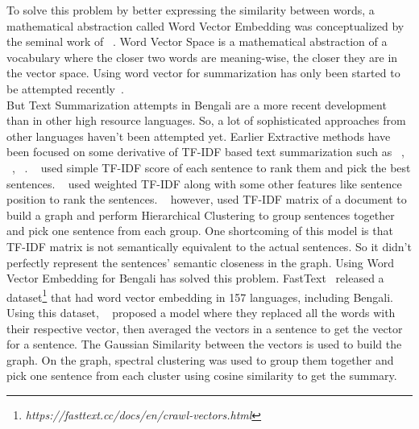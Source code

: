 To solve this problem by better expressing the similarity between words,
a mathematical abstraction called Word Vector Embedding was conceptualized by the seminal
work of \citeauthor{salton-1975-word-vector}~\cite{salton-1975-word-vector}.
Word Vector Space is a mathematical abstraction of a vocabulary where the closer two words
are meaning-wise, the closer they are in the vector space.
Using word vector for summarization has only been started
to be attempted recently~\cite{Jain-2017-word-vector-embedding-summary}.\\

But Text Summarization attempts in Bengali are a more recent development than in other high resource languages.
So, a lot of sophisticated approaches from other languages haven't been attempted yet.
Earlier Extractive methods have been focused on some derivative of TF-IDF based text
summarization such as \citeauthor{chowdhury-etal-2021-tfidf-clustering}~\cite{chowdhury-etal-2021-tfidf-clustering},
\citeauthor{das-2022-tfidf}~\cite{das-2022-tfidf}, \citeauthor{sarkar-2012-tfidf}~\cite{sarkar-2012-tfidf}.
\citeauthor{sarkar-2012-tfidf}~\cite{sarkar-2012-tfidf} used simple TF-IDF score of each sentence to rank them and
pick the best sentences.
\citeauthor{das-2022-tfidf}~\cite{das-2022-tfidf} used weighted TF-IDF along with some other features like sentence position
to rank the sentences.
\citeauthor{chowdhury-etal-2021-tfidf-clustering}~\cite{chowdhury-etal-2021-tfidf-clustering} however, used TF-IDF
matrix of a document to build a graph and perform Hierarchical Clustering to group sentences together and pick one
sentence from each group.
One shortcoming of this model is that TF-IDF matrix is not semantically equivalent to the actual sentences.
So it didn't perfectly represent the sentences' semantic closeness in the graph.
Using Word Vector Embedding for Bengali has solved this problem.
FastText~\cite{grave-etal-2018-fasttext} released a dataset\footnote{\textit{https://fasttext.cc/docs/en/crawl-vectors.html}}
that had word vector embedding in 157 languages, including Bengali.
Using this dataset, \citeauthor{roychowdhury-etal-2022-spectral-base}~\cite{roychowdhury-etal-2022-spectral-base}
proposed a model where they replaced all the words with their respective vector, then averaged the vectors in a
sentence to get the vector for a sentence.
The Gaussian Similarity between the vectors is used to build the graph.
On the graph, spectral clustering was used to group them together and pick one sentence from each cluster using cosine
similarity to get the summary.\\

